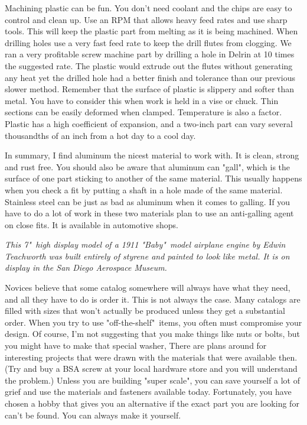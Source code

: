 
Machining plastic can be fun. You don't need coolant and the chips are easy to
control and clean up. Use an RPM that allows heavy feed rates and use sharp
tools. This will keep the plastic part from melting as it is being machined.
When drilling holes use a very fast feed rate to keep the drill flutes from
clogging. We ran a very profitable screw machine part by drilling a hole in
Delrin at 10 times the suggested rate. The plastic would extrude out the flutes
without generating any heat yet the drilled hole had a better finish and
tolerance than our previous slower method. Remember that the surface of plastic
is slippery and softer than metal. You have to consider this when work is held
in a vise or chuck. Thin sections can be easily deformed when clamped.
Temperature is also a factor. Plastic has a high coefficient of expansion, and a
two-inch part can vary several thousandths of an inch from a hot day to a cool
day.


In summary, I find aluminum the nicest material to work with. It is clean,
strong and rust free. You should also be aware that aluminum can "gall", which
is the surface of one part sticking to another of the same material. This
usually happens when you check a fit by putting a shaft in a hole made of the
same material. Stainless steel can be just as bad as aluminum when it comes to
galling. If you have to do a lot of work in these two materials plan to use an
anti-galling agent on close fits. It is available in automotive shops.

\bigskip
\textit{This 7"\ high display model of a 1911 "Baby"\  model airplane engine by
Edwin Teachworth was built entirely of styrene and painted to look like metal.
It is on display in the San Diego Aerospace Museum.}
\bigskip


Novices believe that some catalog somewhere will always have what they need, and
all they have to do is order it. This is not always the case. Many catalogs are
filled with sizes that won't actually be produced unless they get a substantial
order. When you try to use "off-the-shelf"\ items, you often must compromise
your design. Of course, I'm not suggesting that you make things like nuts or
bolts, but you might have to make that special washer, There are plans around
for interesting projects that were drawn with the materials that were available
then. (Try and buy a BSA screw at your local hardware store and you will
understand the problem.) Unless you are building "super scale", you can save
yourself a lot of grief and use the materials and fasteners available today.
Fortunately, you have chosen a hobby that gives you an alternative if the exact
part you are looking for can't be found. You can always make it yourself.

\secup
